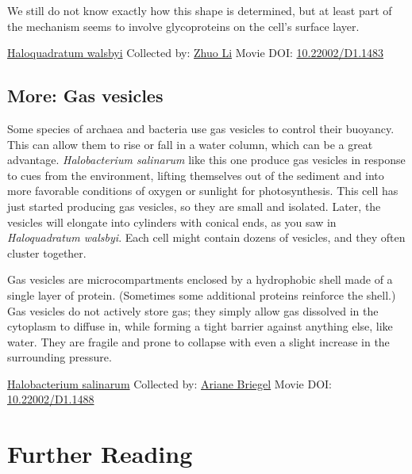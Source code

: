 \documentclass[]{tufte-book}
\begin{document}
We still do not know exactly how this shape is determined, but at least part of the mechanism seems to involve glycoproteins on the cell's surface layer.



\hypertarget{htmlwidget-a28667b37e47fc3fdb9a}{}

\label{fig:3-7}\protect\hyperlink{tree}{Haloquadratum walsbyi} Collected by: \protect\hyperlink{zhuo_li}{Zhuo Li} Movie DOI: \href{https://doi.org/10.22002/D1.1483}{10.22002/D1.1483}

\hypertarget{Gas_vesicles}{%
\subsection*{More: Gas vesicles}\label{Gas_vesicles}}

Some species of archaea and bacteria use gas vesicles to control their buoyancy. This can allow them to rise or fall in a water column, which can be a great advantage. \emph{Halobacterium salinarum} like this one produce gas vesicles in response to cues from the environment, lifting themselves out of the sediment and into more favorable conditions of oxygen or sunlight for photosynthesis. This cell has just started producing gas vesicles, so they are small and isolated. Later, the vesicles will elongate into cylinders with conical ends, as you saw in \emph{Haloquadratum walsbyi}. Each cell might contain dozens of vesicles, and they often cluster together.

Gas vesicles are microcompartments enclosed by a hydrophobic shell made of a single layer of protein. (Sometimes some additional proteins reinforce the shell.) Gas vesicles do not actively store gas; they simply allow gas dissolved in the cytoplasm to diffuse in, while forming a tight barrier against anything else, like water. They are fragile and prone to collapse with even a slight increase in the surrounding pressure.



\hypertarget{htmlwidget-1d7832b42a52f780173c}{}

\label{fig:3-7a}\protect\hyperlink{tree}{Halobacterium salinarum} Collected by: \protect\hyperlink{ariane_briegel}{Ariane Briegel} Movie DOI: \href{https://doi.org/10.22002/D1.1488}{10.22002/D1.1488}

\hypertarget{further-reading-2}{%
\section{Further Reading}\label{further-reading-2}}
\end{document}

